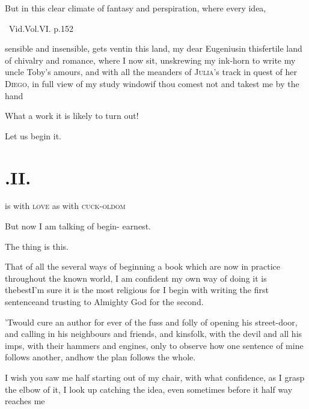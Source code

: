 \documentclass{article}
\begin{document}
But in this clear climate of fantasy\break 
and perspiration, where every idea,

\begingroup\footnotesize\qquad\fnast\ Vid.\@ Vol.\@ VI. p.\@ 152\par\endgroup
\newpage\noindent
sensible and insensible, gets vent\tsk in this land,
my dear Eugenius\tsk in this\break fertile land of chivalry and
romance, where I now sit, unskrewing my ink-horn to write my uncle
Toby’s amours, and with all the meanders of
\textsc{Julia}’s track in quest of her
\textsc{Diego}, in full view of my study window\tsk if thou
comest not and takest me by the hand\tsh

What a work it is likely to turn out!

Let us begin it.




\vfill{}\eject
\null
\section{.\enspace II.}

 is with \textsc{love} as
with \textsc{cuck}-\break\textsc{oldom}\tsh

\bigskip
\tsh But now I am talking of begin-\break
{}
earnest.

The thing is this.

That of all the several ways of beginning a book which are now
in practice throughout the known world, I am confident my own way
of doing it is the\break best\tsh I’m sure it is the most
religious \hbox{}\tsh for I begin with writing the first
sentence\tsh and trusting to Almighty God for the
second.

’Twould cure an author for ever of\break
the fuss and folly of opening his street-door,
and calling in his neighbours and friends, and kinsfolk, with the devil and all his
imps, with their hammers and engines, \etc only to observe how one sentence of mine
follows another, and\break how the plan follows the whole.

I wish you saw me half starting out of my chair, with what confidence, as I grasp
the elbow of it, I look up\tsh{} catching the idea, even sometimes before it half way
reaches me\tsh
\end{document}
